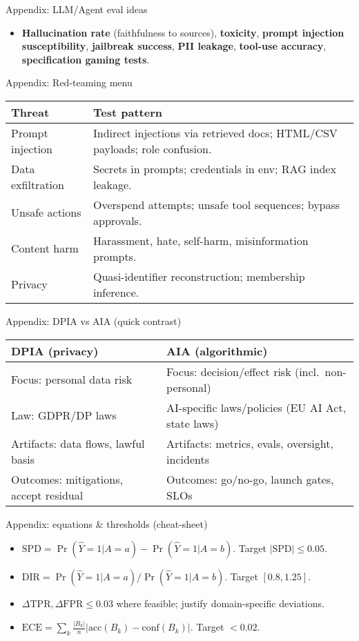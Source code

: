 \documentclass[11pt,aspectratio=169]{beamer}
\begin{document}
\begin{frame}{Appendix: LLM/Agent eval ideas}
\begin{itemize}
  \item \textbf{Hallucination rate} (faithfulness to sources), \textbf{toxicity}, \textbf{prompt injection susceptibility}, \textbf{jailbreak success}, \textbf{PII leakage}, \textbf{tool-use accuracy}, \textbf{specification gaming tests}.
\end{itemize}
\end{frame}

\begin{frame}{Appendix: Red-teaming menu}
\small
\begin{tabular}{p{4.8cm}p{8.8cm}}
\toprule
\textbf{Threat} & \textbf{Test pattern}\\
\midrule
Prompt injection & Indirect injections via retrieved docs; HTML/CSV payloads; role confusion.\\
Data exfiltration & Secrets in prompts; credentials in env; RAG index leakage.\\
Unsafe actions & Overspend attempts; unsafe tool sequences; bypass approvals.\\
Content harm & Harassment, hate, self-harm, misinformation prompts.\\
Privacy & Quasi-identifier reconstruction; membership inference.\\
\bottomrule
\end{tabular}
\end{frame}

\begin{frame}{Appendix: DPIA vs AIA (quick contrast)}
\begin{tabular}{p{5.5cm}p{8.2cm}}
\toprule
\textbf{DPIA (privacy)} & \textbf{AIA (algorithmic)}\\
\midrule
Focus: personal data risk & Focus: decision/effect risk (incl.\ non-personal)\\
Law: GDPR/DP laws & AI-specific laws/policies (EU AI Act, state laws)\\
Artifacts: data flows, lawful basis & Artifacts: metrics, evals, oversight, incidents\\
Outcomes: mitigations, accept residual & Outcomes: go/no-go, launch gates, SLOs\\
\bottomrule
\end{tabular}
\end{frame}

\begin{frame}{Appendix: equations \& thresholds (cheat-sheet)}
\small
\begin{itemize}
  \item \(\mathrm{SPD} = \Pr(\hat{Y}=1|A=a) - \Pr(\hat{Y}=1|A=b)\). Target $|\mathrm{SPD}|\le 0.05$.
  \item \(\mathrm{DIR} = \Pr(\hat{Y}=1|A=a)/\Pr(\hat{Y}=1|A=b)\). Target $[0.8,1.25]$.
  \item \(\Delta \mathrm{TPR}, \Delta \mathrm{FPR} \le 0.03\) where feasible; justify domain-specific deviations.
  \item \(\mathrm{ECE} = \sum_k \frac{|B_k|}{n} \left| \mathrm{acc}(B_k) - \mathrm{conf}(B_k)\right|\). Target $<0.02$.
\end{itemize}
\end{frame}
\end{document}
